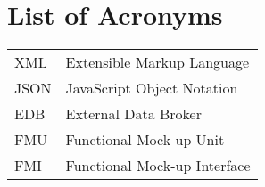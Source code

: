 \section{List of Acronyms}\label{appendix:acronyms}
\begin{longtable}{ll}
  XML &Extensible Markup Language\\
  JSON & JavaScript Object Notation\\
  EDB & External Data Broker \\
  FMU & Functional Mock-up Unit \\
  FMI & Functional Mock-up Interface
\end{longtable}
